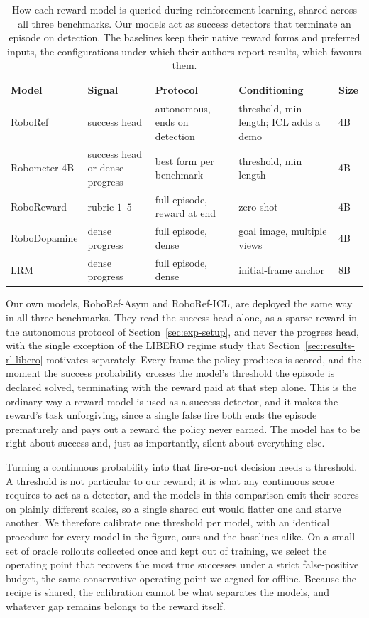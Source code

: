 \begin{table}[t]
\centering\small
\setlength{\tabcolsep}{6pt}
\caption[Reward-model deployment configurations]{How each reward model is queried during reinforcement learning, shared across all three benchmarks. Our models act as success detectors that terminate an episode on detection. The baselines keep their native reward forms and preferred inputs, the configurations under which their authors report results, which favours them.}
\label{tab:rl-config}
\begin{tabular}{@{}lllll@{}}
\toprule
Model & Signal & Protocol & Conditioning & Size \\
\midrule
RoboRef & success head & autonomous, ends on detection & threshold, min length; ICL adds a demo & 4B \\
Robometer-4B & success head or dense progress & best form per benchmark & threshold, min length & 4B \\
RoboReward & rubric $1$--$5$ & full episode, reward at end & zero-shot & 4B \\
RoboDopamine & dense progress & full episode, dense & goal image, multiple views & 4B \\
LRM & dense progress & full episode, dense & initial-frame anchor & 8B \\
\bottomrule
\end{tabular}
\end{table}

Our own models, RoboRef-Asym and RoboRef-ICL, are deployed the same way in all three benchmarks. They read the success head alone, as a sparse reward in the autonomous protocol of Section~\ref{sec:exp-setup}, and never the progress head, with the single exception of the LIBERO regime study that Section~\ref{sec:results-rl-libero} motivates separately. Every frame the policy produces is scored, and the moment the success probability crosses the model's threshold the episode is declared solved, terminating with the reward paid at that step alone. This is the ordinary way a reward model is used as a success detector, and it makes the reward's task unforgiving, since a single false fire both ends the episode prematurely and pays out a reward the policy never earned. The model has to be right about success and, just as importantly, silent about everything else.

Turning a continuous probability into that fire-or-not decision needs a threshold. A threshold is not particular to our reward; it is what any continuous score requires to act as a detector, and the models in this comparison emit their scores on plainly different scales, so a single shared cut would flatter one and starve another. We therefore calibrate one threshold per model, with an identical procedure for every model in the figure, ours and the baselines alike. On a small set of oracle rollouts collected once and kept out of training, we select the operating point that recovers the most true successes under a strict false-positive budget, the same conservative operating point we argued for offline. Because the recipe is shared, the calibration cannot be what separates the models, and whatever gap remains belongs to the reward itself. 


